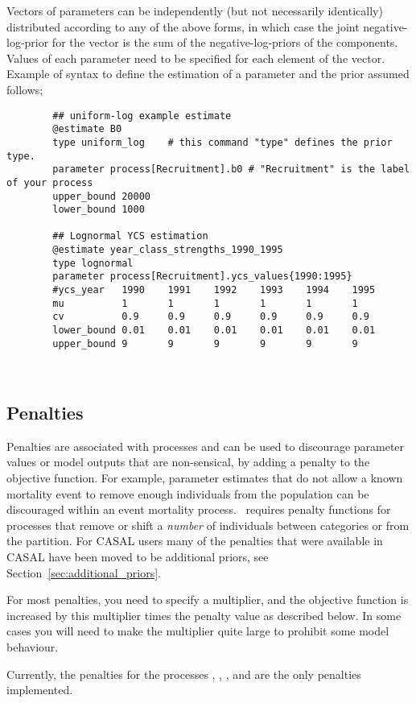Vectors of parameters can be independently (but not necessarily identically) distributed according to any of the above forms, in which case the joint negative-log-prior for the vector is the sum of the negative-log-priors of the components. Values of each parameter need to be specified for each element of the vector. Example of syntax to define the estimation of a parameter and the prior assumed follows;

{\small{\begin{verbatim}
		## uniform-log example estimate
		@estimate B0
		type uniform_log	# this command "type" defines the prior type.
		parameter process[Recruitment].b0 # "Recruitment" is the label of your process
		upper_bound 20000
		lower_bound 1000
		
		## Lognormal YCS estimation
		@estimate year_class_strengths_1990_1995
		type lognormal
		parameter process[Recruitment].ycs_values{1990:1995}
		#ycs_year   1990	1991	1992	1993	1994	1995
		mu   		1   	1   	1   	1   	1   	1
		cv 			0.9 	0.9 	0.9 	0.9 	0.9 	0.9
		lower_bound 0.01	0.01	0.01	0.01	0.01	0.01
		upper_bound 9		9		9		9		9		9	
		
		
\end{verbatim}}}

\subsection{Penalties\label{sec:penalties}}
Penalties are associated with processes and can be used to discourage parameter values or model outputs that are non-sensical, by adding a penalty to the objective function. For example, parameter estimates that do not allow a known mortality event to remove enough individuals from the population can be discouraged within an event mortality process. \CNAME\ requires penalty functions for processes that remove or shift a \emph{number} of individuals between categories or from the partition. For CASAL users many of the penalties that were available in CASAL have been moved to be additional priors, see Section~\ref{sec:additional_priors}.

For most penalties, you need to specify a multiplier, and the objective function is increased by this multiplier times the penalty value as described below. In some cases you will need to make the multiplier quite large to prohibit some model behaviour. 

Currently, the penalties for the processes ,
,
,  and  are the only penalties implemented. 

